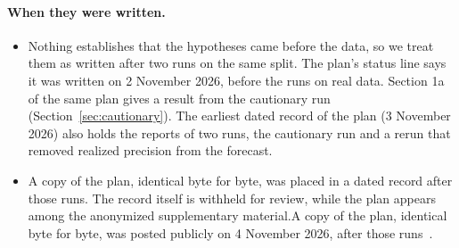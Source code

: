 \paragraph{When they were written.}
\begin{itemize}
\item Nothing establishes that the hypotheses came before the data, so we treat them as written after two runs on the same split. The plan's status line says it was written on 2 November 2026, before the runs on real data. Section 1a of the same plan gives a result from the cautionary run (Section~\ref{sec:cautionary}). The earliest dated record of the plan (3 November 2026) also holds the reports of two runs, the cautionary run and a rerun that removed realized precision from the forecast.
\item \iftmlr A copy of the plan, identical byte for byte, was placed in a dated record after those runs. The record itself is withheld for review, while the plan appears among the anonymized supplementary material.\else A copy of the plan, identical byte for byte, was posted publicly on 4 November 2026, after those runs~\cite{mootcourt2026plan}.\fi

\end{itemize}
